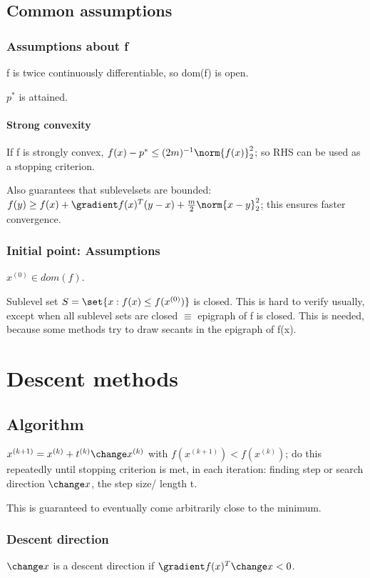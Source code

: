 \documentclass[oneside, article]{memoir}
\begin{document}
\subsection{Common assumptions}
\subsubsection{Assumptions about f}
f is twice continuously differentiable, so dom(f) is open.

$p^{*}$ is attained.

\paragraph*{Strong convexity}
If f is strongly convex, $f(x) - p^{*} \leq (2m)^{-1}\norm{f(x)}_2^{2}$; so RHS can be used as a stopping criterion.

Also guarantees that sublevelsets are bounded: $f(y)\geq f(x) + \gradient f(x)^{T}(y-x) + \frac{m}{2}\norm{x-y}_2^{2}$; this ensures faster convergence.

\subsubsection{Initial point: Assumptions}
$x^{(0)} \in dom(f)$.

Sublevel set $S = \set{x: f(x) \leq f(x^{(0)})}$ is closed. This is hard to verify usually, except when all sublevel sets are closed $\equiv$ epigraph of f is closed. This is needed, because some methods try to draw secants in the epigraph of f(x).

\section{Descent methods}
\subsection{Algorithm}
$x^{(k+1)} = x^{(k)}+ t^{(k)}\change x^{(k)}$ with $f(x^{(k+1)}) < f(x^{(k)})$; do this repeatedly until stopping criterion is met, in each iteration: finding step or search direction $\change x$, the step size/ length t.

This is guaranteed to eventually come arbitrarily close to the minimum.

\subsubsection{Descent direction}
$\change x$ is a descent direction if $\gradient f(x)^{T}\change x < 0$.
\end{document}
